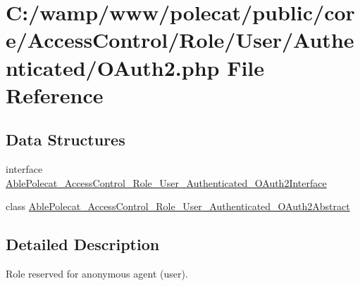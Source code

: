\hypertarget{_o_auth2_8php}{}\section{C\+:/wamp/www/polecat/public/core/\+Access\+Control/\+Role/\+User/\+Authenticated/\+O\+Auth2.php File Reference}
\label{_o_auth2_8php}
\subsection*{Data Structures}
\begin{DoxyCompactItemize}
\item 
interface \hyperlink{interface_able_polecat___access_control___role___user___authenticated___o_auth2_interface}{Able\+Polecat\+\_\+\+Access\+Control\+\_\+\+Role\+\_\+\+User\+\_\+\+Authenticated\+\_\+\+O\+Auth2\+Interface}
\item 
class \hyperlink{class_able_polecat___access_control___role___user___authenticated___o_auth2_abstract}{Able\+Polecat\+\_\+\+Access\+Control\+\_\+\+Role\+\_\+\+User\+\_\+\+Authenticated\+\_\+\+O\+Auth2\+Abstract}
\end{DoxyCompactItemize}


\subsection{Detailed Description}
Role reserved for anonymous agent (user). 
